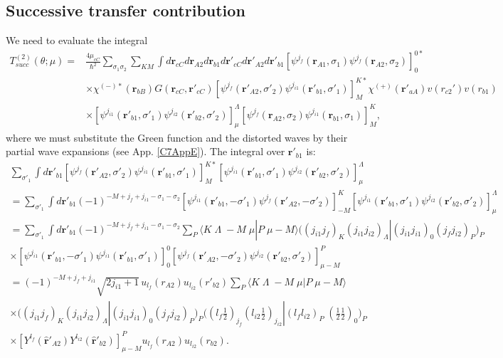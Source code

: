 \subsection{Successive transfer contribution}
We need to evaluate the integral
\begin{equation}\label{eq210}
 \begin{split}
T_{succ}^{(2)}(\theta;\mu)=&\frac{4\mu_{cC}}{\hbar^2}\sum_{\sigma_1 \sigma_2}\sum_{K M} \int d\mathbf{r}_{cC} d\mathbf{r}_{A2}d\mathbf{r}_{b1} d\mathbf{r}'_{cC} d\mathbf{r}'_{A2}d\mathbf{r}'_{b1}  \left[ \psi^{j_f} (\mathbf{r}_{A1}, \sigma_1) \psi^{j_f} (\mathbf{r}_{A2}, \sigma_2) \right] _{0}^{0*} \\
&\times \chi^{(-)*}(\mathbf{r}_{bB})G(\mathbf{r}_{cC},\mathbf{r}'_{cC})
\left[ \psi^{j_f} (\mathbf{r}'_{A2}, \sigma'_2) \psi^{j_{i1}} (\mathbf{r}'_{b1}, \sigma'_1) \right] _{M}^{K*}\chi^{(+)}(\mathbf{r}'_{aA})v(r_{c2}')v(r_{b1})\\
&\times \left[ \psi^{j_{i1}} (\mathbf{r}'_{b1}, \sigma'_1) \psi^{j_{i2}} (\mathbf{r}'_{b2}, \sigma'_2) \right]_{\mu}^{\Lambda}
 \left[ \psi^{j_{f}} (\mathbf{r}_{A2}, \sigma_2) \psi^{j_{i1}} (\mathbf{r}_{b1}, \sigma_1) \right]_{M}^{K},
 \end{split}
\end{equation}
where we must substitute the Green function and the distorted waves by their partial wave expansions (see App. \ref{C7AppE}).
The integral over $\mathbf{r}'_{b1}$ is:
\begin{multline}\label{eq211}
\sum_{\sigma'_1} \int  d\mathbf{r}'_{b1}
\left[ \psi^{j_f} (\mathbf{r}'_{A2}, \sigma'_2) \psi^{j_{i1}} (\mathbf{r}'_{b1}, \sigma'_1) \right] _{M}^{K*}
\left[ \psi^{j_{i1}} (\mathbf{r}'_{b1}, \sigma'_1) \psi^{j_{i2}} (\mathbf{r}'_{b2}, \sigma'_2) \right]_{\mu}^{\Lambda}\\
=\sum_{\sigma'_1} \int  d\mathbf{r}'_{b1}(-1)^{-M+j_f+j_{i1}-\sigma_1-\sigma_2}\left[\psi^{j_{i1}} (\mathbf{r}'_{b1}, -\sigma'_1)\psi^{j_f} (\mathbf{r}'_{A2}, -\sigma'_2) \right] _{-M}^{K}\left[ \psi^{j_{i1}} (\mathbf{r}'_{b1}, \sigma'_1) \psi^{j_{i2}} (\mathbf{r}'_{b2}, \sigma'_2) \right]_{\mu}^{\Lambda}\\
=\sum_{\sigma'_1} \int d\mathbf{r}'_{b1}(-1)^{-M+j_f+j_{i1}-\sigma_1-\sigma_2}\sum_{P} \langle K \;\Lambda\;-M\;\mu|P\;\mu-M\rangle \bigl ( (j_{i1} j_f)_K (j_{i1} j_{i2})_\Lambda |(j_{i1} j_{i1})_0 (j_f j_{i2})_P \bigr )_P\\
\times  \left[ \psi^{j_{i1}} (\mathbf{r}'_{b1}, -\sigma'_1) \psi^{j_{i1}} (\mathbf{r}'_{b1}, \sigma'_1)  \right] ^{0}_0 \left[ \psi^{j_{f}} (\mathbf{r}'_{A2}, -\sigma'_2) \psi^{j_{i2}} (\mathbf{r}'_{b2}, \sigma'_2)  \right] ^{P}_{\mu-M}\\
=(-1)^{-M+j_f+j_{i1}}\sqrt{2j_{i1}+1}\, u_{l_f}(r_{A2})u_{l_{i2}}(r'_{b2})\sum_{P} \langle K \;\Lambda\;-M\;\mu|P\;\mu-M\rangle\\
\times \bigl ((j_{i1} j_f)_K (j_{i1} j_{i2})_\Lambda |(j_{i1} j_{i1})_0 (j_f j_{i2})_P \bigr )_P \bigl ( (l_f \tfrac{1}{2})_{j_f} (l_{i2} \tfrac{1}{2})_{j_{i2}} |(l_f l_{i2})_P\; (\tfrac{1}{2} \tfrac{1}{2})_0 \bigr )_P\\
\times \left[ Y^{l_f} (\hat{\mathbf{r}}'_{A2}) Y^{l_{i2}} (\hat{\mathbf{r}}'_{b2})  \right] ^{P}_{\mu-M}u_{l_{f}}(r_{A2})u_{l_{i2}}(r_{b2}).
\end{multline}
